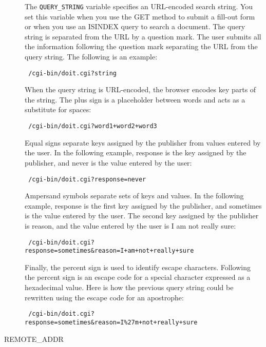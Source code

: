 \begin{description}
The \verb|QUERY_STRING| variable specifies an URL-encoded search string. You set
this variable when you use the GET method to submit a fill-out form or
when you use an ISINDEX query to search a document. The query string is
separated from the URL by a question mark. The user submits all the
information following the question mark separating the URL from the query
string. The following is an example:

\begin{verbatim}
 /cgi-bin/doit.cgi?string
\end{verbatim}

When the query string is URL-encoded, the browser encodes key parts of the
string. The plus sign is a placeholder between words and acts as a
substitute for spaces:

\begin{verbatim}
 /cgi-bin/doit.cgi?word1+word2+word3
\end{verbatim}

Equal signs separate keys assigned by the publisher from values entered by
the user. In the following example, response is the key assigned by the
publisher, and never is the value entered by the user:

\begin{verbatim}
 /cgi-bin/doit.cgi?response=never
\end{verbatim}

Ampersand symbols separate sets of keys and values. In the following
example, response is the first key assigned by the publisher, and
sometimes is the value entered by the user. The second key assigned by the
publisher is reason, and the value entered by the user is I am not really
sure:

{\footnotesize
\begin{verbatim}
 /cgi-bin/doit.cgi?response=sometimes&reason=I+am+not+really+sure
\end{verbatim}
}

Finally, the percent sign is used to identify escape characters. Following
the percent sign is an escape code for a special character expressed as a
hexadecimal value. Here is how the previous query string could be
rewritten using the escape code for an apostrophe:

{\footnotesize
\begin{verbatim}
 /cgi-bin/doit.cgi?response=sometimes&reason=I%27m+not+really+sure
\end{verbatim}
}


\item[REMOTE\_ADDR]


\end{description}
